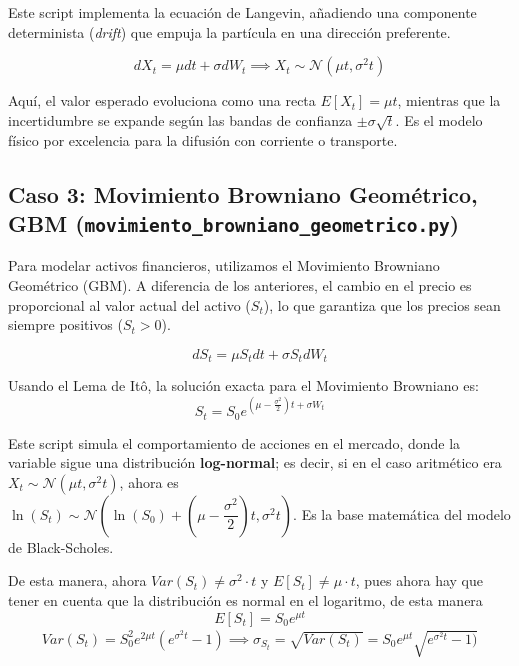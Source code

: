 \documentclass[11pt]{article}
\newcommand{\mult}[0]{\!\cdot\!} %
\begin{document}
			Este script implementa la ecuación de Langevin, añadiendo una componente determinista (\textit{drift}) que empuja la partícula en una dirección preferente.
			
			\begin{equation}
				dX_t = \mu dt + \sigma dW_t \implies X_t \sim \mathcal{N}(\mu t, \sigma^2 t)
			\end{equation}
			
			Aquí, el valor esperado evoluciona como una recta $E[X_t] = \mu t$, mientras que la incertidumbre se expande según las bandas de confianza $\pm \sigma \sqrt{t}$. Es el modelo físico por excelencia para la difusión con corriente o transporte.
			
		\subsection{Caso 3: Movimiento Browniano Geométrico, GBM (\texttt{movimiento\_browniano\_geometrico.py})}
			\label{MB geom}
				
			Para modelar activos financieros, utilizamos el Movimiento Browniano Geométrico (GBM). A diferencia de los anteriores, el cambio en el precio es proporcional al valor actual del activo ($S_t$), lo que garantiza que los precios sean siempre positivos ($S_t > 0$).
			
			\begin{equation}
				dS_t = \mu S_t dt + \sigma S_t dW_t
			\end{equation}
			
			Usando el Lema de Itô, la solución exacta para el Movimiento Browniano es:
			\begin{equation}
				\boxed{S_t = S_0 e^{ \left(\mu - \frac{\sigma^2}{2}\right)t + \sigma W_t}}
			\end{equation}
			
			Este script simula el comportamiento de acciones en el mercado, donde la variable sigue una distribución \textbf{log-normal}; es decir, si en el caso aritmético era $X_t \sim \mathcal{N}(\mu t,\sigma^2t)$, ahora es \\
			$\ln(S_t) \sim \mathcal{N}\left( \ln(S_0) + \left( \mu - \dfrac{\sigma^2}{2} \right)t  , \sigma^2 t \right)$. Es la base matemática del modelo de Black-Scholes.
				
			De esta manera, ahora $Var(S_t) \neq \sigma^2 \mult t$ y $E[S_t] \neq \mu \mult t$, pues ahora hay que tener en cuenta que la distribución es normal en el logaritmo, de esta manera 
			\begin{equation*}
				\boxed{E[S_t] = S_0e^{ \mu t}}
			\end{equation*}
			\begin{gather*}
				\boxed{Var(S_t) = S_0^2 e^{2\mu t}(e^{\sigma^2t} - 1) \implies  \sigma_{S_t} = \sqrt{Var(S_t)} = S_0 e^{\mu t}\sqrt{e^{\sigma^2t} - 1)}
				}
			\end{gather*}
	
\end{document}
